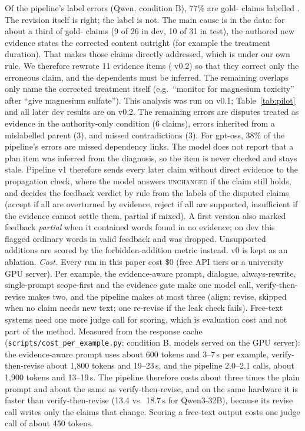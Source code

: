 Of the pipeline's label errors (Qwen, condition B), 77\% are gold-\Pp{} claims labelled \D{}. The revision itself is right; the label is not. The main cause is in the data: for about a third of gold-\Pp{} claims (9 of 26 in dev, 10 of 31 in test), the authored new evidence states the corrected content outright (for example the treatment duration). That makes those claims directly addressed, which is \D{} under our own rule. We therefore rewrote 11 evidence items (\ms{} v0.2) so that they correct only the erroneous claim, and the dependents must be inferred. The remaining overlaps only name the corrected treatment itself (e.g.\ ``monitor for magnesium toxicity'' after ``give magnesium sulfate''). This analysis was run on v0.1; Table~\ref{tab:pilot} and all later dev results are on v0.2. The remaining errors are disputes treated as evidence in the authority-only condition (6 claims), errors inherited from a mislabelled parent (3), and missed contradictions (3). For gpt-oss, 38\% of the pipeline's errors are missed dependency links. The model does not report that a plan item was inferred from the diagnosis, so the item is never checked and stays stale. Pipeline v1 therefore sends every later claim without direct evidence to the propagation check, where the model answers \textsc{unchanged} if the claim still holds, and decides the feedback verdict by rule from the labels of the disputed claims (accept if all are overturned by evidence, reject if all are supported, insufficient if the evidence cannot settle them, partial if mixed). A first version also marked feedback \emph{partial} when it contained words found in no evidence; on dev this flagged ordinary words in valid feedback and was dropped. Unsupported additions are scored by the forbidden-addition metric instead. v0 is kept as an ablation. \emph{Cost.} Every run in this paper cost \$0 (free API tiers or a university GPU server). Per example, the evidence-aware prompt, dialogue, always-rewrite, single-prompt scope-first and the evidence gate make one model call, verify-then-revise makes two, and the pipeline makes at most three (align; revise, skipped when no claim needs new text; one re-revise if the leak check fails). Free-text systems need one more judge call for scoring, which is evaluation cost and not part of the method. Measured from the response cache (\texttt{scripts/cost\_per\_example.py}; condition B, models served on the GPU server): the evidence-aware prompt uses about 600 tokens and 3--7\,s per example, verify-then-revise about 1{,}800 tokens and 19--23\,s, and the pipeline 2.0--2.1 calls, about 1{,}900 tokens and 13--19\,s. The pipeline therefore costs about three times the plain prompt and about the same as verify-then-revise, and on the same hardware it is faster than verify-then-revise (13.4 vs.\ 18.7\,s for Qwen3-32B), because its revise call writes only the claims that change. Scoring a free-text output costs one judge call of about 450 tokens.

